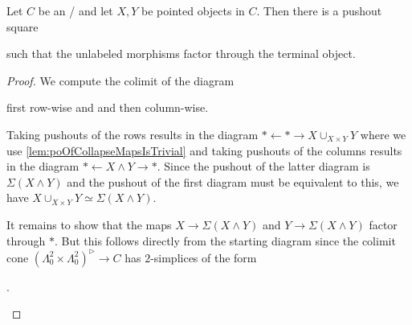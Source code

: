 \begin{lemma}\label{lem:poSqWithFactoringTerminal}
    Let $C$ be an \inftytop/ and let $X,Y$ be pointed objects in $C$. 
    Then there is a pushout square
    \begin{center}
    \end{center}
    such that the unlabeled morphisms factor through the terminal object.
    \begin{proof}
        We compute the colimit of the diagram
        \begin{center}
        \end{center}
        first row-wise and and then column-wise.
        
        Taking pushouts of the rows results in the diagram $*\xleftarrow{}*\rightarrow X\cup_{X\times Y} Y$ where we use \cref{lem:poOfCollapseMapsIsTrivial} and taking pushouts of the columns results in the diagram $*\xleftarrow{}X\wedge Y\rightarrow *$. 
        Since the pushout of the latter diagram is $\Sigma\left(X\wedge Y\right)$ and the pushout of the first diagram must be equivalent to this, we have $X\cup_{X\times Y} Y\simeq\Sigma\left(X\wedge Y\right)$.
        
        It remains to show that the maps $X\to\Sigma\left(X\wedge Y\right)$ and $Y\to\Sigma\left(X\wedge Y\right)$ factor through $*$.
        But this follows directly from the starting diagram since the colimit cone $\left(\Lambda_0^2\times\Lambda_0^2\right)^{\rhd}\to C$ has $2$-simplices of the form
        \begin{center}
            \;.
        \end{center}
    \end{proof}
\end{lemma}
